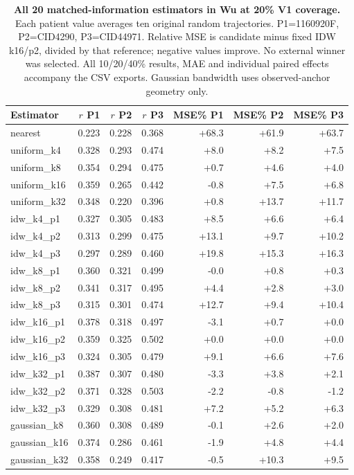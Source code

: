 \begin{table}[!htbp]
\caption{\textbf{All 20 matched-information estimators in Wu at 20\% V1 coverage.} Each patient value averages ten original random trajectories. P1=1160920F, P2=CID4290, P3=CID44971. Relative MSE is candidate minus fixed IDW k16/p2, divided by that reference; negative values improve. No external winner was selected. All 10/20/40\% results, MAE and individual paired effects accompany the CSV exports. Gaussian bandwidth uses observed-anchor geometry only.}
\label{tab:journal_baselines}
\centering\footnotesize
\begin{tabular}{@{}lrrrrrr@{}}
\toprule
Estimator & $r$ P1 & $r$ P2 & $r$ P3 & MSE\% P1 & MSE\% P2 & MSE\% P3 \\
\midrule
nearest & 0.223 & 0.228 & 0.368 & +68.3 & +61.9 & +63.7 \\
uniform\_k4 & 0.328 & 0.293 & 0.474 & +8.0 & +8.2 & +7.5 \\
uniform\_k8 & 0.354 & 0.294 & 0.475 & +0.7 & +4.6 & +4.0 \\
uniform\_k16 & 0.359 & 0.265 & 0.442 & -0.8 & +7.5 & +6.8 \\
uniform\_k32 & 0.348 & 0.220 & 0.396 & +0.8 & +13.7 & +11.7 \\
idw\_k4\_p1 & 0.327 & 0.305 & 0.483 & +8.5 & +6.6 & +6.4 \\
idw\_k4\_p2 & 0.313 & 0.299 & 0.475 & +13.1 & +9.7 & +10.2 \\
idw\_k4\_p3 & 0.297 & 0.289 & 0.460 & +19.8 & +15.3 & +16.3 \\
idw\_k8\_p1 & 0.360 & 0.321 & 0.499 & -0.0 & +0.8 & +0.3 \\
idw\_k8\_p2 & 0.341 & 0.317 & 0.495 & +4.4 & +2.8 & +3.0 \\
idw\_k8\_p3 & 0.315 & 0.301 & 0.474 & +12.7 & +9.4 & +10.4 \\
idw\_k16\_p1 & 0.378 & 0.318 & 0.497 & -3.1 & +0.7 & +0.0 \\
idw\_k16\_p2 & 0.359 & 0.325 & 0.502 & +0.0 & +0.0 & +0.0 \\
idw\_k16\_p3 & 0.324 & 0.305 & 0.479 & +9.1 & +6.6 & +7.6 \\
idw\_k32\_p1 & 0.387 & 0.307 & 0.480 & -3.3 & +3.8 & +2.1 \\
idw\_k32\_p2 & 0.371 & 0.328 & 0.503 & -2.2 & -0.8 & -1.2 \\
idw\_k32\_p3 & 0.329 & 0.308 & 0.481 & +7.2 & +5.2 & +6.3 \\
gaussian\_k8 & 0.360 & 0.308 & 0.489 & -0.1 & +2.6 & +2.0 \\
gaussian\_k16 & 0.374 & 0.286 & 0.461 & -1.9 & +4.8 & +4.4 \\
gaussian\_k32 & 0.358 & 0.249 & 0.417 & -0.5 & +10.3 & +9.5 \\
\bottomrule
\end{tabular}
\end{table}
\FloatBarrier
